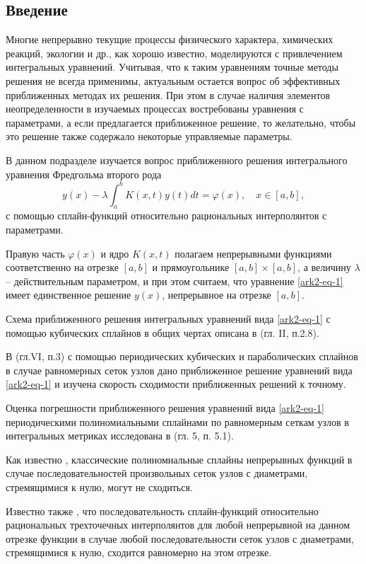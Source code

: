 \subsection{Введение}
Многие непрерывно текущие процессы физического характера, химических реакций,
экологии и др., как хорошо известно, моделируются с привлечением
интегральных уравнений.
Учитывая, что к таким уравнениям точные методы решения не всегда применимы,
актуальным
остается вопрос об эффективных приближенных методах их решения. При этом
в случае наличия
элементов
неопределенности в изучаемых процессах востребованы уравнения с параметрами,
а если
предлагается приближенное решение, то желательно, чтобы это решение также
содержало некоторые управляемые параметры.

В данном подразделе изучается вопрос приближенного решения интегрального уравнения
Фредгольма второго рода
\begin{equation}\label{ark2-eq-1}
y(x)-\lambda \int_a^b K(x,t)y(t)dt=\varphi(x),\quad x\in[a,b],
\end{equation}
с помощью сплайн-функций относительно рациональных интерполянтов с параметрами.

Правую часть $\varphi(x)$ и ядро $K(x,t)$ полагаем непрерывными функциями соответственно
на отрезке $[a,b]$ и прямоугольнике $[a,b]\times[a,b]$, а величину $\lambda$ -- действительным
параметром, и при этом считаем, что уравнение \eqref{ark2-eq-1} имеет единственное решение $y(x)$, непрерывное
на отрезке $[a,b]$.

Схема приближенного решения интегральных уравнений вида \eqref{ark2-eq-1} с помощью кубических сплайнов
в общих чертах описана в \cite{ark-4} (гл. II, п.2.8).

В \cite{ark-7} (гл.VI, п.3) с помощью периодических кубических и параболических сплайнов
в случае равномерных сеток узлов дано приближенное решение уравнений вида \eqref{ark2-eq-1}
и изучена скорость сходимости приближенных решений к точному.

Оценка погрешности приближенного решения уравнений вида \eqref{ark2-eq-1} периодическими полиномиальными
сплайнами по равномерным сеткам узлов в интегральных метриках исследована в
\cite{ark-12} (гл. 5, п. 5.1).

Как известно \cite{ark-4, ark-7}, классические полиномиальные сплайны непрерывных функций в случае последовательностей произвольных сеток узлов с диаметрами, стремящимися к нулю, могут не сходиться.

Известно также \cite{ark-9}, что последовательность сплайн-функций относительно рациональных
 трехточечных интерполянтов для любой непрерывной на данном отрезке функции в случае
любой последовательности сеток узлов с диаметрами, стремящимися к нулю, сходится равномерно
 на этом отрезке.

